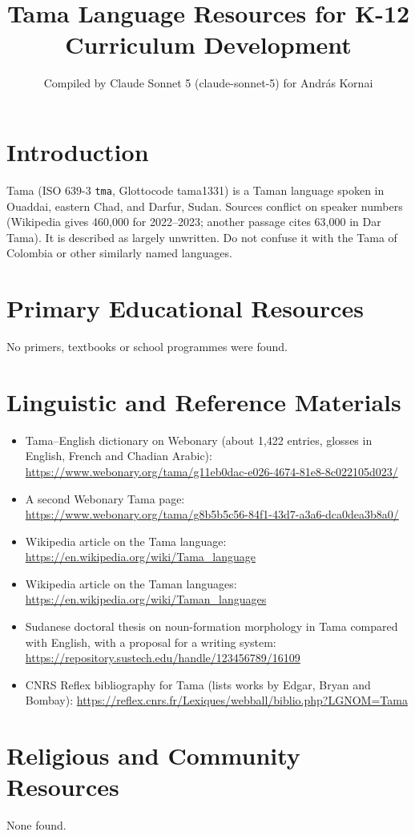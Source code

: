\documentclass[12pt]{article}
\title{Tama Language Resources for K-12 Curriculum Development}
\author{Compiled by Claude Sonnet 5 (claude-sonnet-5) for Andr\'as Kornai}
\date{}
\begin{document}
\maketitle

\section{Introduction}
Tama (ISO 639-3 \texttt{tma}, Glottocode tama1331) is a Taman language spoken in Ouaddai, eastern Chad, and Darfur, Sudan. Sources conflict on speaker numbers (Wikipedia gives 460,000 for 2022--2023; another passage cites 63,000 in Dar Tama). It is described as largely unwritten. Do not confuse it with the Tama of Colombia or other similarly named languages.

\section{Primary Educational Resources}
No primers, textbooks or school programmes were found.

\section{Linguistic and Reference Materials}
\begin{itemize}
\item Tama--English dictionary on Webonary (about 1,422 entries, glosses in English, French and Chadian Arabic): \url{https://www.webonary.org/tama/g11eb0dac-e026-4674-81e8-8c022105d023/}
\item A second Webonary Tama page: \url{https://www.webonary.org/tama/g8b5b5c56-84f1-43d7-a3a6-dca0dea3b8a0/}
\item Wikipedia article on the Tama language: \url{https://en.wikipedia.org/wiki/Tama_language}
\item Wikipedia article on the Taman languages: \url{https://en.wikipedia.org/wiki/Taman_languages}
\item Sudanese doctoral thesis on noun-formation morphology in Tama compared with English, with a proposal for a writing system: \url{https://repository.sustech.edu/handle/123456789/16109}
\item CNRS Reflex bibliography for Tama (lists works by Edgar, Bryan and Bombay): \url{https://reflex.cnrs.fr/Lexiques/webball/biblio.php?LGNOM=Tama}
\end{itemize}

\section{Religious and Community Resources}
None found.
\end{document}
